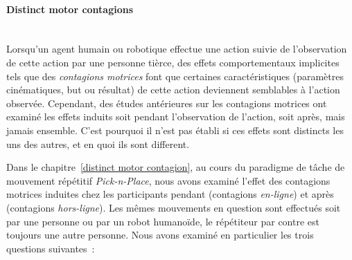 \paragraph*{\LARGE {Distinct motor contagions \\}\\}

Lorsqu'un agent humain ou robotique effectue une action suivie de l'observation de cette action par une personne tièrce, des effets comportementaux implicites tels que des \emph{contagions motrices} font que certaines caractéristiques (paramètres cinématiques, but ou résultat) de cette action deviennent semblables à l'action observée. Cependant, des études antérieures sur les contagions motrices ont examiné les effets induits soit pendant l'observation de l'action, soit après, mais jamais ensemble. C'est pourquoi il n'est pas établi si ces effets sont distincts les uns des autres, et en quoi ils sont different.



Dans le chapitre~\ref{distinct motor contagion}, au cours du paradigme de tâche de mouvement répétitif \textit{Pick-n-Place}, nous avons examiné l'effet des contagions motrices induites chez les participants pendant (contagions \emph{en-ligne}) et après (contagions \emph{hors-ligne}). Les mêmes mouvements en question sont effectués soit par une personne ou par un robot humanoïde, le répétiteur par contre est toujours une autre personne. Nous avons examiné en particulier les trois questions suivantes~:



